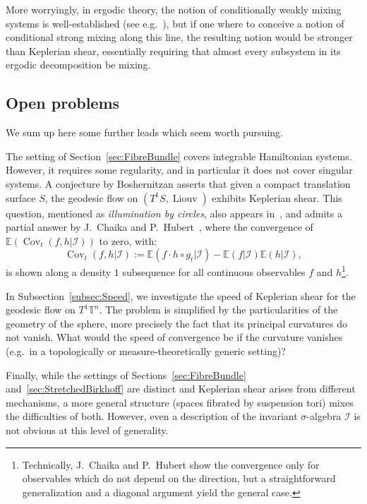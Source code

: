 \documentclass[AHL,Unicode,longabstracts]{cedram}
\DeclareMathOperator{\Cov}{Cov}
\DeclareMathOperator{\Liouv}{Liouv}
\newcommand{\Ebb}{\mathbb{E}}
\newcommand{\Tbb}{\mathbb{T}}
\newcommand{\Ical}{\mathcal{I}}
\begin{document}

More worryingly, in ergodic theory, the notion of conditionally weakly mixing systems is well-established (see e.g.~\cite{Tao:2008}), but if one where to conceive a notion of conditional strong mixing along this line, the resulting notion would be stronger than Keplerian shear, essentially requiring that almost every subsystem in its ergodic decomposition be mixing.


\subsection{Open problems}

We sum up here some further leads which seem worth pursuing.


The setting of Section~\ref{sec:FibreBundle} covers integrable Hamiltonian systems. However, it requires some regularity, and in particular it does not cover singular systems. A conjecture by Boshernitzan asserts that given a compact translation surface $S$, the geodesic flow on $(T^1 S, \Liouv)$ exhibits Keplerian shear. This question, mentioned as \emph{illumination by circles}, also appears in~\cite{Monteil:2005}, and admits a partial answer by J.~Chaika and P.~Hubert~\cite{ChaikaHubert:2015}, where the convergence of $\Ebb (\Cov_t (f, h|\Ical))$ to zero, with:
\[
\Cov_t (f, h|\Ical) := \Ebb (f \cdot h \circ g_t|\Ical) - \Ebb (f |\Ical)\Ebb (h|\Ical),
\]
is shown along a density $1$ subsequence for all continuous observables $f$ and $h$\footnote{Technically, J.~Chaika and P.~Hubert show the convergence only for observables which do not depend on the direction, but a straightforward generalization and a diagonal argument yield the general case.}.


In Subsection~\ref{subsec:Speed}, we investigate the speed of Keplerian shear for the geodesic flow on $T^1 \Tbb^n$. The problem is simplified by the particularities of the geometry of the sphere, more precisely the fact that its principal curvatures do not vanish. What would the speed of convergence be if the curvature vanishes (e.g.~in a topologically or measure-theoretically generic setting)?


Finally, while the settings of Sections~\ref{sec:FibreBundle} and~\ref{sec:StretchedBirkhoff} are distinct and Keplerian shear arises from different mechanisms, a more general structure (spaces fibrated by suspension tori) mixes the difficulties of both. However, even a description of the invariant $\sigma$-algebra $\Ical$ is not obvious at this level of generality.
\end{document}
